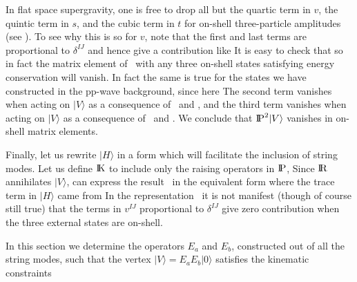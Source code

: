 In flat space supergravity, one is
free to drop all but the quartic term in $v$, the quintic term
in $s$, and the cubic term in $t$ for on-shell three-particle
amplitudes (see \GreenTK).
To see why this is so for $v$, note that the first and last terms
are proportional to $\delta^{IJ}$ and hence give
a contribution like
\eqn{}
It is easy to check that
\eqn{}
so in fact the matrix element of \vanishes\ with any three on-shell
states satisfying energy conservation will vanish.
In fact the same is true for the states we have constructed
in the pp-wave background, since here
\eqn{}
The second term vanishes when acting on $|V\rangle$ as a consequence of
\ronv\ and \breqtwo, and the third term vanishes when acting on
$|V\rangle$ as a consequence of \freqone\ and \thetaonv.
We conclude that $\relax{\rm I\kern-.18em P}^2 |V \rangle$ 
vanishes in on-shell matrix elements.

Finally, let us rewrite $|H\rangle$ in a form which will facilitate
the inclusion of string modes. 
Let us define $\relax{\rm I\kern-.18em K}$ to include only the raising operators in
$\relax{\rm I\kern-.18em P}$,
\eqn{}
Since $\relax{\rm I\kern-.18em R}$ annihilates $|V\rangle$, can express
the result
\ansatz\ in the equivalent form
\eqn{}
where the trace term in $|H\rangle$ came from
\eqn{}
In the representation \anssugra\ it is not manifest
(though of course still true) that the
terms in $v^{IJ}$ proportional to $\delta^{IJ}$ give zero contribution
when the three external states are on-shell.



In this section we determine
the operators $E_a$ and $E_b$, constructed out of all the
string modes,
such that the vertex $|V \rangle = E_a E_b|0\rangle$
satisfies the kinematic constraints
\eqn{}

